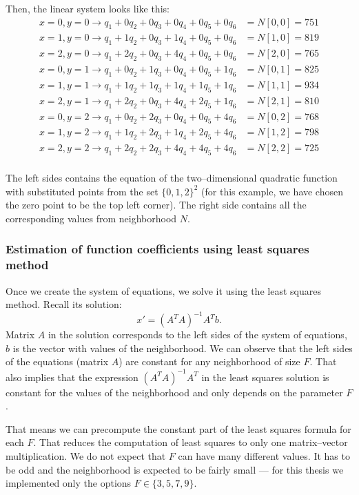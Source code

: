 Then, the linear system looks like this:
\begin{align*}
x=0,y=0 \rightarrow q_1 + 0q_2 + 0q_3 + 0q_4 + 0q_5 + 0q_6 &= N[0,0] = 751 \\
x=1,y=0 \rightarrow q_1 + 1q_2 + 0q_3 + 1q_4 + 0q_5 + 0q_6 &= N[1,0] = 819 \\
x=2,y=0 \rightarrow q_1 + 2q_2 + 0q_3 + 4q_4 + 0q_5 + 0q_6 &= N[2,0] = 765 \\
x=0,y=1 \rightarrow q_1 + 0q_2 + 1q_3 + 0q_4 + 0q_5 + 1q_6 &= N[0,1] = 825 \\
x=1,y=1 \rightarrow q_1 + 1q_2 + 1q_3 + 1q_4 + 1q_5 + 1q_6 &= N[1,1] = 934 \\
x=2,y=1 \rightarrow q_1 + 2q_2 + 0q_3 + 4q_4 + 2q_5 + 1q_6 &= N[2,1] = 810 \\
x=0,y=2 \rightarrow q_1 + 0q_2 + 2q_3 + 0q_4 + 0q_5 + 4q_6 &= N[0,2] = 768 \\
x=1,y=2 \rightarrow q_1 + 1q_2 + 2q_3 + 1q_4 + 2q_5 + 4q_6 &= N[1,2] = 798 \\
x=2,y=2 \rightarrow q_1 + 2q_2 + 2q_3 + 4q_4 + 4q_5 + 4q_6 &= N[2,2] = 725 \\
\end{align*}

The left sides contains the equation of the two--dimensional quadratic function with substituted points from the set $\{0,1,2\}^2$ (for this example, we have chosen the zero point to be the top left corner). The right side contains all the corresponding values from neighborhood $N$.

\subsubsection{Estimation of function coefficients using least squares method}
\label{estimation}

Once we create the system of equations, we solve it using the least squares method. Recall its solution:
\[
x' = (A^TA)^{-1}A^Tb.
\]
Matrix $A$ in the solution corresponds to the left sides of the system of equations, $b$ is the vector with values of the neighborhood. We can observe that the left sides of the equations (matrix $A$) are constant for any neighborhood of size $F$. That also implies that the expression $(A^TA)^{-1}A^T$ in the least squares solution is constant for the values of the neighborhood and only depends on the parameter $F$.

That means we can precompute the constant part of the least squares formula for each $F$. That reduces the computation of least squares to only one matrix--vector multiplication. We do not expect that $F$ can have many different values. It has to be odd and the neighborhood is expected to be fairly small --- for this thesis we implemented only the options $F \in \{3, 5, 7, 9\}$.


